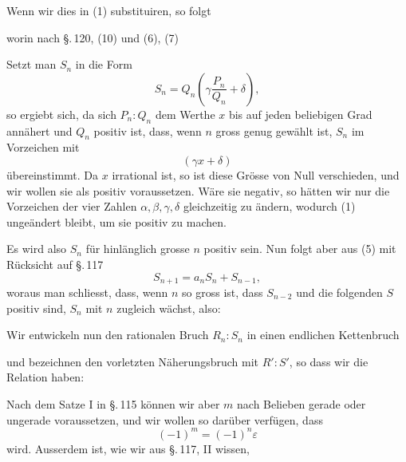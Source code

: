 
Wenn wir dies in (1) substituiren, so folgt


worin nach \S.\,120, (10) und (6), (7)



Setzt man $S_n$ in die Form
\[
S_n = Q_n\left(\gamma \frac{P_n}{Q_n} + \delta\right),
\]
so ergiebt sich, da sich $P_n : Q_n$ dem Werthe $x$ bis auf jeden beliebigen Grad annähert und $Q_n$ positiv ist, dass, wenn $n$ gross genug gewählt ist, $S_n$ im Vorzeichen mit
\[
(\gamma x + \delta)
\]
übereinstimmt. Da $x$ irrational ist, so ist diese Grösse von Null verschieden, und wir wollen sie als positiv voraussetzen. Wäre sie negativ, so hätten wir nur die Vorzeichen der vier Zahlen $\alpha, \beta, \gamma, \delta$ gleichzeitig zu ändern, wodurch (1) ungeändert bleibt, um sie positiv zu machen.

Es wird also $S_n$ für hinlänglich grosse $n$ positiv sein. Nun folgt aber aus (5) mit Rücksicht auf \S.\,117
\[
S_{n+1} = a_n S_n + S_{n-1},
\]
woraus man schliesst, dass, wenn $n$ so gross ist, dass $S_{n-2}$ und die folgenden $S$ positiv sind, $S_n$ mit $n$ zugleich wächst, also:


Wir entwickeln nun den rationalen Bruch $R_n : S_n$ in einen endlichen Kettenbruch


und bezeichnen den vorletzten Näherungsbruch mit $R' : S'$, so dass wir die Relation haben:


Nach dem Satze I in \S.\,115 können wir aber $m$ nach Belieben gerade oder ungerade voraussetzen, und wir wollen so darüber verfügen, dass
\[
(-1)^m = (-1)^n \varepsilon
\]
wird. Ausserdem ist, wie wir aus \S.\,117, II wissen,
